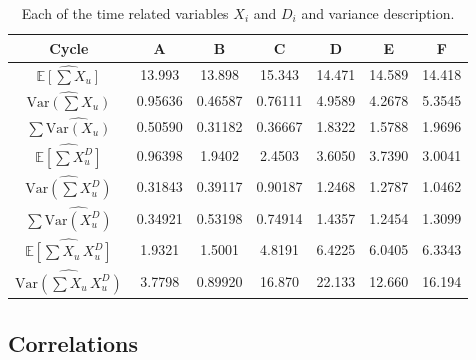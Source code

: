 \documentclass[../Thesis.tex]{subfiles}
\begin{document}
\begin{table}[h]
    \centering
    \begin{tabular}{c|cccccc}
        Cycle                                                 & A       & B       & C       & D      & E      & F      \\\hline
        $\widehat{\mathbb{E}\left[\sum X_u\right]}$           & 13.993  & 13.898  & 15.343  & 14.471 & 14.589 & 14.418 \\\hline
        $\widehat{\text{Var}\left(\sum X_u\right)}$           & 0.95636 & 0.46587 & 0.76111 & 4.9589 & 4.2678 & 5.3545 \\\hline
        $\sum \widehat{\text{Var}\left(X_u\right)}$           & 0.50590 & 0.31182 & 0.36667 & 1.8322 & 1.5788 & 1.9696 \\\hline
        $\widehat{\mathbb{E} \left[\sum X^D_u\right]}$        & 0.96398 & 1.9402  & 2.4503  & 3.6050 & 3.7390 & 3.0041 \\\hline
        $\widehat{ \text{Var} \left(\sum X^D_u\right)}$       & 0.31843 & 0.39117 & 0.90187 & 1.2468 & 1.2787 & 1.0462 \\\hline
        $\sum \widehat{\text{Var}\left(X^D_u\right)}$         & 0.34921 & 0.53198 & 0.74914 & 1.4357 & 1.2454 & 1.3099 \\\hline
        $\widehat{\mathbb{E} \left[\sum X_u \, X^D_u\right]}$ & 1.9321  & 1.5001  & 4.8191  & 6.4225 & 6.0405 & 6.3343 \\\hline
        $\widehat{\text{Var} \left(\sum X_u \, X^D_u\right)}$ & 3.7798  & 0.89920 & 16.870  & 22.133 & 12.660 & 16.194
    \end{tabular}
    \caption{Each of the time related variables $X_i$ and $D_i$ and variance description.}
    \label{tab:data variation and covariance}
\end{table}


\subsection{Correlations}
\end{document}
